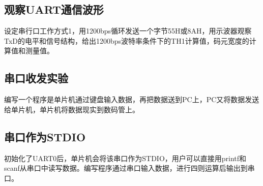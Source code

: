 \begin{CJK}
\subsection{观察UART通信波形}
设定串行口工作方式1，用1200bps循环发送一个字节55H或8AH，用示波器观察TxD的电平和信号结构，给出1200bps波特率条件下的TH1计算值，码元宽度的计算值和测量值。
\subsection{串口收发实验}
编写一个程序是单片机通过键盘输入数据，再把数据送到PC上，PC又将数据发送给单片机，单片机将数据现实到数码管上。
\subsection{串口作为STDIO}
初始化了UART0后，单片机会将该串口作为STDIO，用户可以直接用printf和scanf从串口中读写数据。编写程序通过串口输入数据，进行四则运算后输出到串口。



\end{CJK}

